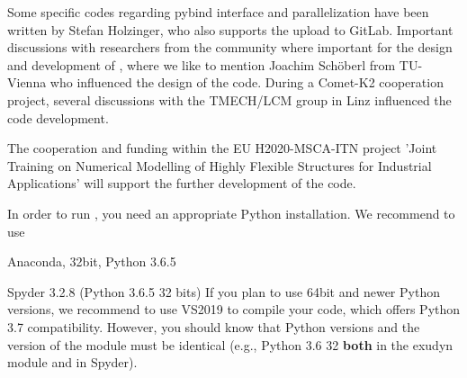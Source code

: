 Some specific codes regarding pybind interface and parallelization have been written by Stefan Holzinger, who also supports the upload to GitLab.
Important discussions with researchers from the community where important for the design and development of \codeName , where we like to mention Joachim Sch{\"o}berl from TU-Vienna who influenced the design of the code. During a Comet-K2 cooperation project, several discussions with the TMECH/LCM group in Linz influenced the code development.

The cooperation and funding within the EU H2020-MSCA-ITN project 'Joint Training on Numerical Modelling of Highly Flexible Structures for Industrial Applications' will support the further development of the code.
%

In order to run \codeName , you need an appropriate Python installation.
We recommend to use
\bi
  \item Anaconda, 32bit, Python 3.6.5
	\item Spyder 3.2.8 (Python 3.6.5 32 bits)	
\ei
If you plan to use 64bit and newer Python versions, we recommend to use VS2019 to compile your code, which offers Python 3.7 compatibility.
However, you should know that Python versions and the version of the module must be identical (e.g., Python 3.6 32 {\bf both} in the exudyn module and in Spyder).

